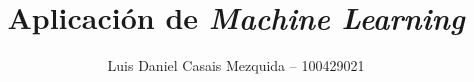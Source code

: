 \documentclass[es]{uc3mreport}
\author{Luis Daniel Casais Mezquida -- 100429021}
\title{Aplicación de \textit{Machine Learning}}
\begin{document}
  \makecover[old]

  \tableofcontents

  \begin{report}


  \end{report}



\end{document}
